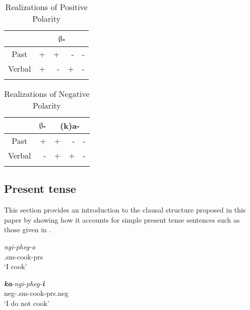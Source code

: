 \documentclass[output=paper]{langsci/langscibook}
\begin{document}
\begin{table}
\caption{Realizations of Positive Polarity} %
\centering %
\begin{tabular}{c rrrr} %
\lsptoprule%
  &\multicolumn{4}{c}{$\emptyset$-} \\ %
\midrule%
Past & + & + & - & -\\ %
Verbal & + & - & +& -\\[1ex] %
\lspbottomrule%
\end{tabular} 
\label{tab:burkholder:1}
\end{table} 

\begin{table}
\caption{Realizations of Negative Polarity} %
\centering %
\begin{tabular}{c r|rrr} %
\lsptoprule%
 &\multicolumn{1}{c}{$\emptyset$-} &\multicolumn{3}{|c}{(k)a-} \\ %
\midrule%
Past & + & + & - & -\\ %
Verbal & - & + & +& -\\[1ex] %
\lspbottomrule%
\end{tabular} 
\label{tab:burkholder:2}
\end{table} 






\subsection{Present tense}\label{sec:burkholder:2.2}

This section provides an introduction to the clausal structure proposed in this paper by showing how it accounts for simple present tense sentences such as those given in .
 

\begin{exe}
\ex\label{ex:burkholder:4}  
\begin{xlist}
\ex\label{ex:burkholder:4a} 
\gll  \textit{ngi-pheg-a}\\
          .{\sc sm}-cook-\sc prs\\
    \glt `I cook'

\ex\label{ex:burkholder:4b}  
\gll  \textit{\textbf{ka}}-\textit{ngi-pheg-\textbf{i}}\\
          {\sc neg}-.{\sc sm}-cook-{\sc prs.neg}\\
    \glt `I do not cook'
\end{xlist}
\end{exe}
 
\end{document}

